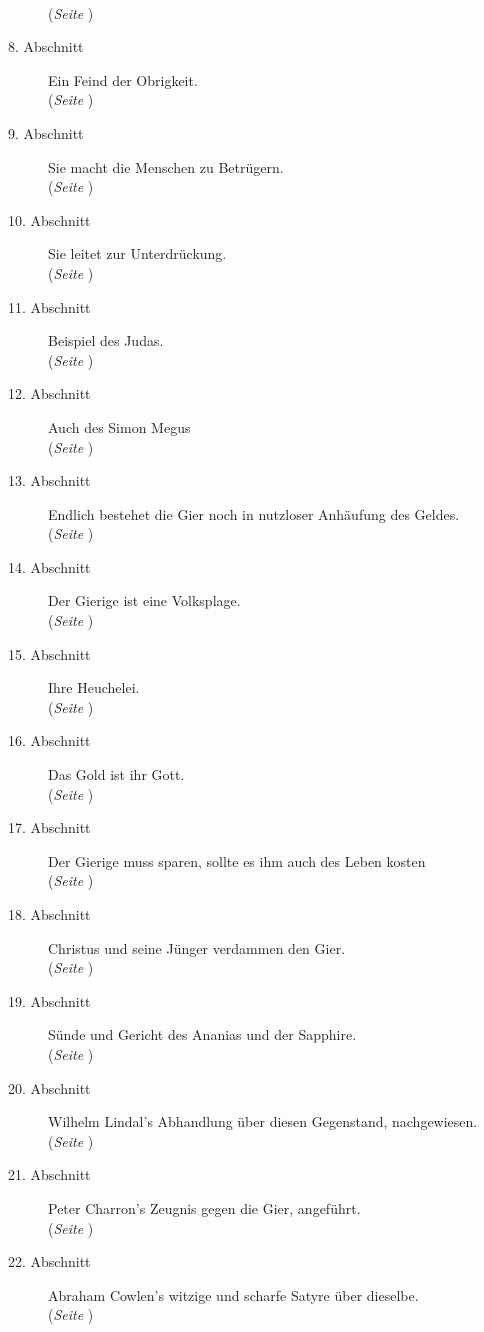 \begin{description}
\\(\textit{Seite \pageref{kap13_ab7}})
\item[8. Abschnitt] Ein Feind der Obrigkeit.
\\(\textit{Seite \pageref{kap13_ab8}})
\item[9. Abschnitt] Sie macht die Menschen zu Betrügern.
\\(\textit{Seite \pageref{kap13_ab9}})
\item[10. Abschnitt] Sie leitet zur Unterdrückung.
\\(\textit{Seite \pageref{kap13_ab10}})
\item[11. Abschnitt] Beispiel des Judas.
\\(\textit{Seite \pageref{kap13_ab11}})
\item[12. Abschnitt] Auch des Simon Megus
\\(\textit{Seite \pageref{kap13_ab12}})
\item[13. Abschnitt] Endlich bestehet die Gier noch in nutzloser Anhäufung des
Geldes.
\\(\textit{Seite \pageref{kap13_ab13}})
\item[14. Abschnitt] Der Gierige ist eine Volksplage.
\\(\textit{Seite \pageref{kap13_ab14}})
\item[15. Abschnitt] Ihre Heuchelei.
\\(\textit{Seite \pageref{kap13_ab15}})
\item[16. Abschnitt] Das Gold ist ihr Gott.
\\(\textit{Seite \pageref{kap13_ab16}})
\item[17. Abschnitt] Der Gierige muss sparen, sollte es ihm auch des Leben kosten
\\(\textit{Seite \pageref{kap13_ab17}})
\item[18. Abschnitt] Christus und seine Jünger verdammen den Gier.
\\(\textit{Seite \pageref{kap13_ab18}})
\item[19. Abschnitt] Sünde und Gericht des Ananias und der Sapphire.
\\(\textit{Seite \pageref{kap13_ab19}})
\item[20. Abschnitt] Wilhelm Lindal's Abhandlung über diesen Gegenstand,
nachgewiesen.
\\(\textit{Seite \pageref{kap13_ab20}})
\item[21. Abschnitt] Peter Charron's Zeugnis gegen die Gier, angeführt.
\\(\textit{Seite \pageref{kap13_ab21}})
\item[22. Abschnitt] Abraham Cowlen's witzige und scharfe Satyre über dieselbe.
\\(\textit{Seite \pageref{kap13_ab22}})

\end{description}
\normalsize


